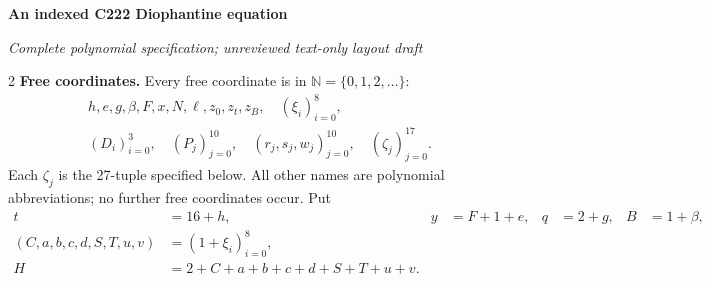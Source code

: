 \documentclass[10pt,letterpaper]{article}
\newcommand{\NN}{\mathbb N}
\begin{document}
\fontsize{9}{10.2}\selectfont
\begin{center}
{\fontsize{11}{12}\selectfont\bfseries An indexed C222 Diophantine equation}\par
\textit{Complete polynomial specification; unreviewed text-only layout draft}
\end{center}
\vspace{-4pt}
\begin{multicols}{2}
\textbf{Free coordinates.}
Every free coordinate is in $\NN=\{0,1,2,\ldots\}$:
\[
\begin{gathered}
h,e,g,\beta,F,x,N,\ell,z_0,z_t,z_B,\quad(\xi_i)_{i=0}^8,\\
(D_i)_{i=0}^3,\quad(P_j)_{j=0}^{10},\quad
(r_j,s_j,w_j)_{j=0}^{10},\quad(\zeta_j)_{j=0}^{17}.
\end{gathered}
\]
Each $\zeta_j$ is the 27-tuple specified below. All other names are
polynomial abbreviations; no further free coordinates occur. Put
\[
\begin{aligned}
t&=16+h,&y&=F+1+e,&q&=2+g,&B&=1+\beta,\\
(C,a,b,c,d,S,T,u,v)&=(1+\xi_i)_{i=0}^8,\\
H&=2+C+a+b+c+d+S+T+u+v.
\end{aligned}
\]


\end{multicols}
\end{document}
